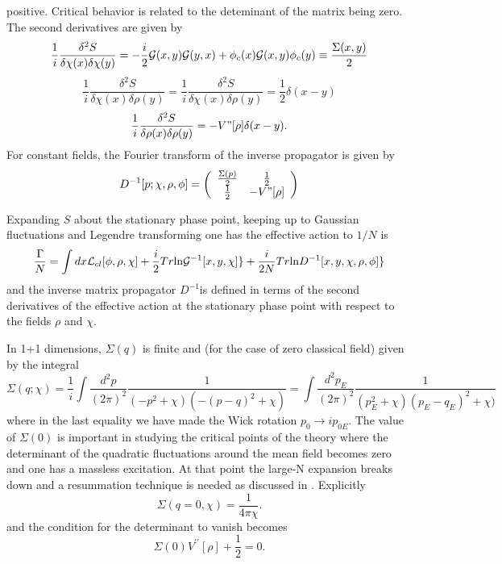 \documentclass[a4paper,prd,preprint,superscriptaddress,showpacs,byrevtex]{revtex4}
\begin{document}
positive. Critical behavior is related to the deteminant of the matrix being
zero.   The second derivatives are given by
\begin{equation}
\frac{1}{i} \frac {\delta^2 S}{\delta \chi(x) \delta \chi (y)} =
-\frac{i}{2}
{\cal G} (x,y) {\cal G}(y,x) + \phi_c(x) {\cal G}(x,y) \phi_c(y) \equiv
\frac
{\Sigma(x,y)}{2}
\end{equation}
\begin{equation}
\frac{1}{i} \frac
{\delta^2 S} {\delta \chi(x) \delta \rho(y)}=\frac{1}{i} \frac {\delta^2 S}
{\delta \chi(x) \delta \rho(y)} =\frac{1}{2} \delta (x-y)
\end{equation}
\begin{equation}
\frac{1}{i} \frac {\delta^2 S}{\delta \rho(x) \delta \rho (y)}= - V"[\rho]
\delta(x-y).
\end{equation}
For constant fields, the Fourier transform of the inverse propagator is
given
by  \begin{equation}
  D^{-1}[p;\chi,\rho,\phi] =
\left( \begin{array}{cc}
 \frac{\Sigma(p)}{2} & \frac{1}{2} \\
\frac{1}{2} & -V"[\rho]
\end{array}
\right)
\end{equation}

   Expanding $S$ about the stationary phase point, keeping up to Gaussian
fluctuations and Legendre transforming one has the effective action to $1/N$
is
\begin{equation} \frac {\Gamma}{N}=  \int dx {\cal L}_{cl}[\phi,\rho,\chi] +
\frac{i}{2} Tr {\ln} {\cal G}^{-1} [x,y, \chi] \}+\frac{i}{2 N} Tr {\ln}
D^{-1} [x,y, \chi,\rho, \phi] \} \end{equation} and the inverse matrix
propagator $D^{-1}$is defined in terms of the second derivatives of the
effective action at the stationary phase point with respect to the fields
$\rho$ and $\chi$.

In 1+1 dimensions, $\Sigma(q)$ is
finite
and (for the case of zero classical field) given by the integral
\begin{equation}
\Sigma(q; \chi) = \frac{1} {i} \int \frac{d^2 p}{(2\pi)^2} \frac{1}{(-p^2 +
\chi)(-(p-q)^2 + \chi)}= \int \frac{d^2 p_E}{(2\pi)^2} \frac{1}{(p_E^2 +
\chi)(p_E-q_E)^2 + \chi)}
\end{equation}
where in the last equality we have made the Wick rotation $p_0 \rightarrow i
p_{0E}$.  The value of $\Sigma(0)$ is important in studying the critical
points of the theory where the determinant of the quadratic fluctuations
around the mean field becomes zero and one has a massless  excitation.  At
that
point the large-N expansion breaks down and a resummation technique is
needed
as discussed in \cite{ref:Eyal}.  Explicitly \begin{equation}
\Sigma(q=0,\chi) = \frac{1}{4 \pi \chi}.
\end{equation}
and the condition for the determinant to vanish becomes
\begin{equation}
\Sigma(0) V^{\prime \prime} [\rho] + \frac{1}{2} = 0. \label{eq:detzero}
\end{equation}
\end{document}
